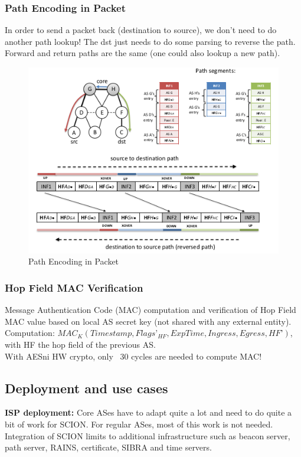 \documentclass[11pt,oneside,a4paper]{article}
\begin{document}
\subsubsection{Path Encoding in Packet}

In order to send a packet back (destination to source), we don't need to do another path lookup! The dst just needs to do some parsing to reverse the path. Forward and return paths are the same (one could also lookup a new path).

\begin{figure}[t!]
	\centering
	\includegraphics[width=0.7\linewidth]{figures/scion_path_encoding}
	\caption{Path Encoding in Packet}
	\label{fig:scionpathencoding}
\end{figure}

\subsubsection{Hop Field MAC Verification}

Message Authentication Code (MAC) computation and verification of Hop Field MAC value based on local AS secret key (not shared with any external entity).\\
Computation: $MAC_K(Timestamp,Flags’_{HF},ExpTime,Ingress,Egress, HF’)$, with HF the hop field of the previous AS.\\
With AESni HW crypto, only ~30 cycles are needed to compute MAC!

\newpage

\subsection{Deployment and use cases}

\noindent \textbf{ISP deployment:} Core ASes have to adapt quite a lot and need to do quite a bit of work for SCION. For regular ASes, most of this work is not needed. Integration of SCION limits to additional infrastructure such as beacon server, path server, RAINS, certificate, SIBRA and time servers.
\end{document}
